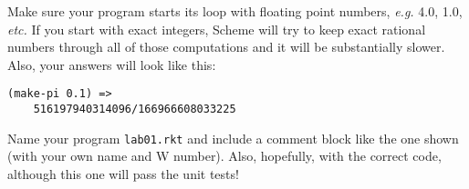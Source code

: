 \documentclass{article}
\begin{document}
\begin{multicols}{2}
\begin{description}
Make sure your program starts its loop with floating point numbers,
{\em e.g.} 4.0, 1.0, {\em etc.}  If you start with exact integers,
Scheme will try to keep exact rational numbers through all of those
computations and it will be substantially slower.  Also, your answers
will look like this:
\begin{Verbatim}[frame=single]
(make-pi 0.1) => 
    516197940314096/166966608033225
\end{Verbatim}

Name your program {\tt lab01.rkt} and include a comment block like the
one shown (with your own name and W number).  Also, hopefully, with
the correct code, although this one will pass the unit tests!


\end{description}
\end{multicols}
\end{document}
